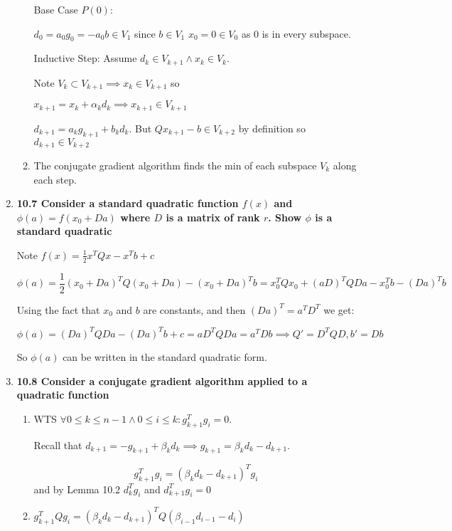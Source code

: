 \documentclass[10pt,a4paper]{article}
\begin{document}
\begin{enumerate}
\begin{enumerate}
        Base Case $P(0)$:

        $d_0 = a_0g_0 = -a_0b \in V_1$ since $b \in V_1$ 
        $x_0 = 0 \in V_0$ as $0$ is in every subspace.

        Inductive Step: Assume $d_k \in V_{k+1} \land x_k \in V_{k}$.

        Note $V_k \subset V_{k+1} \implies x_k \in V_{k+1}$ so 

        $x_{k+1} = x_k + \alpha_k d_k \implies x_{k+1} \in V_{k+1}$

        $d_{k+1} = a_k g_{k+1} + b_k d_k$. But $Qx_{k+1} -b \in V_{k+2}$ by definition so $d_{k+1} \in V_{k+2}$

        \item The conjugate gradient algorithm finds the min of each subspace $V_k$ along each step.

    \end{enumerate}

    \item \textbf{10.7 Consider a standard quadratic function $f(x)$ and $\phi(a) = f(x_0+Da)$ where $D$ is a matrix of rank $r$. Show $\phi$ is a standard quadratic }
    
    Note $f(x) = \frac{1}{2}x^TQx - x^Tb +c$

    $$\phi(a) = \frac{1}{2}(x_0+Da)^TQ(x_0+Da) - (x_0+Da)^Tb = x_0^TQx_0 + (aD)^TQDa - x_0^Tb - (Da)^Tb$$

    Using the fact that $x_0$ and $b$ are constants, and then $(Da)^T = a^TD^T$ we get:

    $$\phi(a) = (Da)^TQDa - (Da)^Tb +c = aD^TQDa = a^TDb \implies Q' = D^TQD, b' = Db$$

    So $\phi(a)$ can be written in the standard quadratic form.

    \item \textbf{10.8 Consider a conjugate gradient algorithm applied to a quadratic function}
    \begin{enumerate}    
        \item WTS $\forall 0 \leq k \leq n-1 \land 0 \leq i \leq k: g_{k+1}^Tg_i = 0 $.
        
        Recall that $d_{k+1} = -g_{k+1} + \beta_k d_k \implies  g_{k+1} = \beta_k d_k - d_{k+1}$.

        $$g_{k+1}^Tg_i = (\beta_k d_k -d_{k+1})^T g_i$$ and by Lemma 10.2 $d_k^Tg_i$ and $d_{k+1}^Tg_i = 0$

        \item $g_{k+1}^TQg_i  = (\beta_k d_k - d_{k+1})^TQ(\beta_{i-1} d_{i-1} - d_i)$
        

\end{enumerate}
\end{enumerate}
\end{document}

